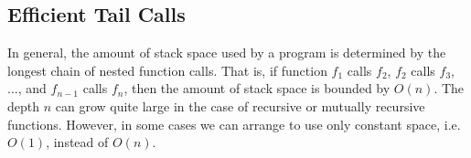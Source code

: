 \documentclass[11pt]{book}
\begin{document}


\subsection{Efficient Tail Calls}
\label{sec:tail-call}

In general, the amount of stack space used by a program is determined
by the longest chain of nested function calls. That is, if function
$f_1$ calls $f_2$, $f_2$ calls $f_3$, $\ldots$, and $f_{n-1}$ calls
$f_n$, then the amount of stack space is bounded by $O(n)$.  The depth
$n$ can grow quite large in the case of recursive or mutually
recursive functions. However, in some cases we can arrange to use only
constant space, i.e. $O(1)$, instead of $O(n)$.
\end{document}
